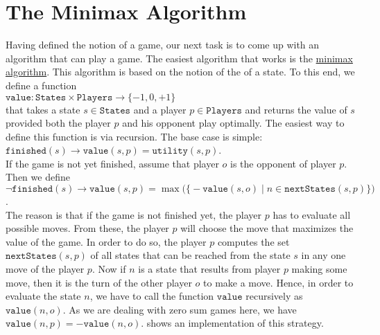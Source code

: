\section{The Minimax Algorithm}
Having defined the notion of a game, our next task is to come up with an algorithm that can play a game.  The
easiest algorithm that works is the \href{https://en.wikipedia.org/wiki/Minimax}{minimax algorithm}.  This
algorithm is based on the notion of the  of a state.  To this end, we define a function
\\[0.2cm]
\hspace*{1.3cm}
$\mathtt{value}: \mathtt{States} \times \mathtt{Players} \rightarrow \{-1, 0, +1\}$
\\[0.2cm]
that takes a state $s \in \mathtt{States}$ and a player $p \in \mathtt{Players}$ and returns the value of $s$ provided both the player $p$ and his
opponent play optimally.  The easiest way to define this function is via recursion.  The base case is simple:
\\[0.2cm]
\hspace*{1.3cm}
$\mathtt{finished}(s) \rightarrow \mathtt{value}(s, p) = \mathtt{utility}(s, p)$.
\\[0.2cm]
If the game is not yet finished, assume that player $o$ is the opponent of player $p$.  Then we define
\\[0.2cm]
\hspace*{1.3cm}
$\neg \mathtt{finished}(s) \rightarrow 
 \mathtt{value}(s, p) = \max\bigl(\bigl\{
                     -\mathtt{value}(s, o) \mid n \in \mathtt{nextStates}(s, p)
                     \bigr\}\bigr)
$.
\\[0.2cm]
The reason is that if the game is not finished yet, the player $p$ has to evaluate all possible moves.  
From these, the player $p$ will choose the move that maximizes the value of the game.  In order to do so, the
player $p$ computes the set 
$\mathtt{nextStates}(s, p)$ of all states that can be reached from the state $s$ in any one move of the player $p$.
Now if $n$ is a state that results from player $p$ making some move, then it is the turn of the other player
$o$ to make a move.  Hence, in order to evaluate the state $n$, we have to call the function $\mathtt{value}$
recursively as $\mathtt{value}(n,o)$.  As we are dealing with zero sum games here, we have $\mathtt{value}(n, p) = -\mathtt{value}(n, o)$.
 shows an implementation of this strategy.


